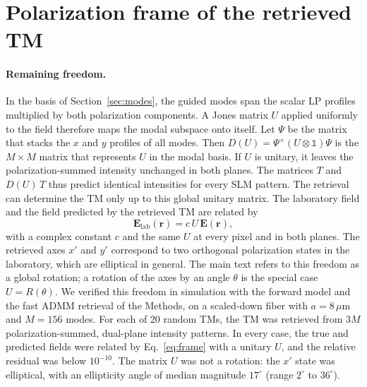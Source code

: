 \documentclass{article}
\begin{document}
\section{Polarization frame of the retrieved TM}
\label{sec:polframe}

\paragraph{Remaining freedom.}
In the basis of Section~\ref{sec:modes}, the guided modes span the scalar LP profiles multiplied by both polarization components.
A Jones matrix $U$ applied uniformly to the field therefore maps the modal subspace onto itself.
Let $\Psi$ be the matrix that stacks the $x$ and $y$ profiles of all modes.
Then $D(U)=\Psi^{+}(U\otimes\mathbb{1})\Psi$ is the $M\times M$ matrix that represents $U$ in the modal basis.
If $U$ is unitary, it leaves the polarization-summed intensity unchanged in both planes.
The matrices $T$ and $D(U)\,T$ thus predict identical intensities for every SLM pattern.
The retrieval can determine the TM only up to this global unitary matrix.
The laboratory field and the field predicted by the retrieved TM are related by
\begin{equation}
\label{eq:frame}
\mathbf{E}_{\mathrm{lab}}(\mathbf{r})=c\,U\,\mathbf{E}(\mathbf{r}),
\end{equation}
with a complex constant $c$ and the same $U$ at every pixel and in both planes.
The retrieved axes $x'$ and $y'$ correspond to two orthogonal polarization states in the laboratory, which are elliptical in general.
The main text refers to this freedom as a global rotation; a rotation of the axes by an angle $\theta$ is the special case $U=R(\theta)$.
We verified this freedom in simulation with the forward model and the fast ADMM retrieval of the Methods, on a scaled-down fiber with $a=8\,\mu$m and $M=156$ modes.
For each of 20 random TMs, the TM was retrieved from $3M$ polarization-summed, dual-plane intensity patterns.
In every case, the true and predicted fields were related by Eq.~\eqref{eq:frame} with a unitary $U$, and the relative residual was below $10^{-10}$.
The matrix $U$ was not a rotation: the $x'$ state was elliptical, with an ellipticity angle of median magnitude $17^\circ$ (range $2^\circ$ to $36^\circ$).
\end{document}

